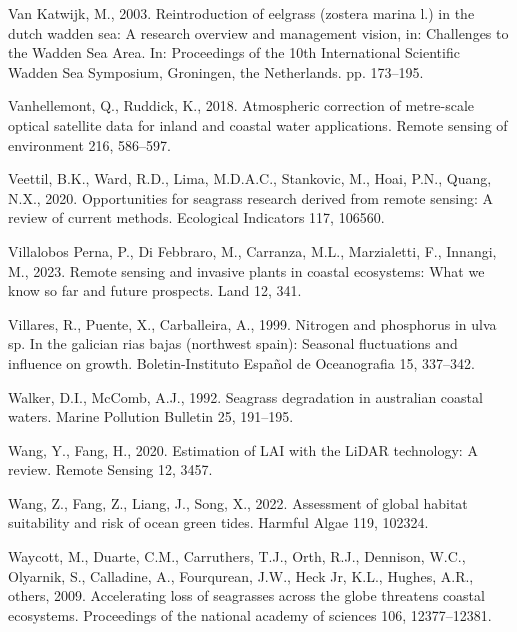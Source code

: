 \documentclass[
  letterpaper,
  11pt,
  english,
  singlespacing,
  headsepline]{MastersDoctoralThesis}
\newlength{\cslhangindent}
\newenvironment{CSLReferences}[2] %
 {\begin{list}{}{%
  \setlength{\itemindent}{0pt}
  \setlength{\leftmargin}{0pt}
  \setlength{\parsep}{0pt}
  \ifodd #1
   \setlength{\leftmargin}{\cslhangindent}
   \setlength{\itemindent}{-1\cslhangindent}
  \fi
  \setlength{\itemsep}{#2\baselineskip}}}
 {\end{list}}
\begin{document}
\begin{CSLReferences}{1}{0}
Van Katwijk, M., 2003. Reintroduction of eelgrass (zostera marina l.) in
the dutch wadden sea: A research overview and management vision, in:
Challenges to the Wadden Sea Area. In: Proceedings of the 10th
International Scientific Wadden Sea Symposium, Groningen, the
Netherlands. pp. 173--195.

Vanhellemont, Q., Ruddick, K., 2018. Atmospheric correction of
metre-scale optical satellite data for inland and coastal water
applications. Remote sensing of environment 216, 586--597.

Veettil, B.K., Ward, R.D., Lima, M.D.A.C., Stankovic, M., Hoai, P.N.,
Quang, N.X., 2020. Opportunities for seagrass research derived from
remote sensing: A review of current methods. Ecological Indicators 117,
106560.

Villalobos Perna, P., Di Febbraro, M., Carranza, M.L., Marzialetti, F.,
Innangi, M., 2023. Remote sensing and invasive plants in coastal
ecosystems: What we know so far and future prospects. Land 12, 341.

Villares, R., Puente, X., Carballeira, A., 1999. Nitrogen and phosphorus
in ulva sp. In the galician rias bajas (northwest spain): Seasonal
fluctuations and influence on growth. Boletin-Instituto Espa{ñ}ol de
Oceanografia 15, 337--342.

Walker, D.I., McComb, A.J., 1992. Seagrass degradation in australian
coastal waters. Marine Pollution Bulletin 25, 191--195.

Wang, Y., Fang, H., 2020. Estimation of LAI with the LiDAR technology: A
review. Remote Sensing 12, 3457.

Wang, Z., Fang, Z., Liang, J., Song, X., 2022. Assessment of global
habitat suitability and risk of ocean green tides. Harmful Algae 119,
102324.

Waycott, M., Duarte, C.M., Carruthers, T.J., Orth, R.J., Dennison, W.C.,
Olyarnik, S., Calladine, A., Fourqurean, J.W., Heck Jr, K.L., Hughes,
A.R., others, 2009. Accelerating loss of seagrasses across the globe
threatens coastal ecosystems. Proceedings of the national academy of
sciences 106, 12377--12381.


\end{CSLReferences}
\end{document}
